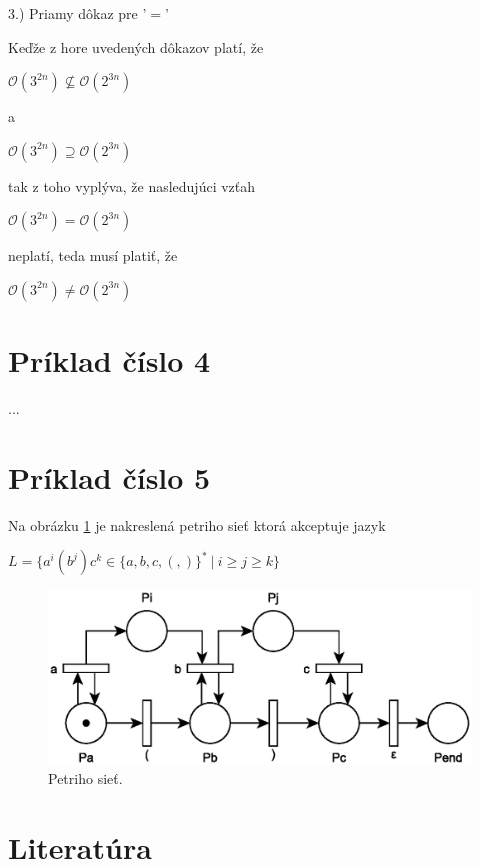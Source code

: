 \documentclass[11pt,a4paper]{article}
\begin{document}
\hspace{5mm}3.) Priamy dôkaz pre '$=$'

\begin{flushright}
\begin{minipage}{0.92\textwidth}
  Keďže z hore uvedených dôkazov platí, že
  \begin{center}
    $\mathcal{O}(3^{2n}) \nsubseteq \mathcal{O}(2^{3n})$
  \end{center}
  a
  \begin{center}
    $\mathcal{O}(3^{2n}) \supseteq \mathcal{O}(2^{3n})$
  \end{center}
  tak z toho vyplýva, že nasledujúci vzťah
  \begin{center}
    $\mathcal{O}(3^{2n}) = \mathcal{O}(2^{3n})$
  \end{center}
  neplatí, teda musí platiť, že
  \begin{center}
    $\mathcal{O}(3^{2n}) \neq \mathcal{O}(2^{3n})$
  \end{center}
\end{minipage}
\end{flushright}

\newpage
\section{Príklad číslo 4}

...

\newpage
\section{Príklad číslo 5}

Na obrázku \ref{fig:pn} je nakreslená petriho sieť ktorá akceptuje jazyk

\begin{center}
$L = \{a^i(b^j)c^k \in \{a,b,c,(,)\}^* \ | \ i \geq j \geq k\}$
\end{center}

\begin{figure}[H]
  \centering
  \includegraphics[scale=1]{img/pn.eps}
  \caption{Petriho sieť.}
  \label{fig:pn}
\end{figure}


\newpage
\section{Literatúra}

\begin{flushleft}
    
\end{flushleft}
\end{document}
